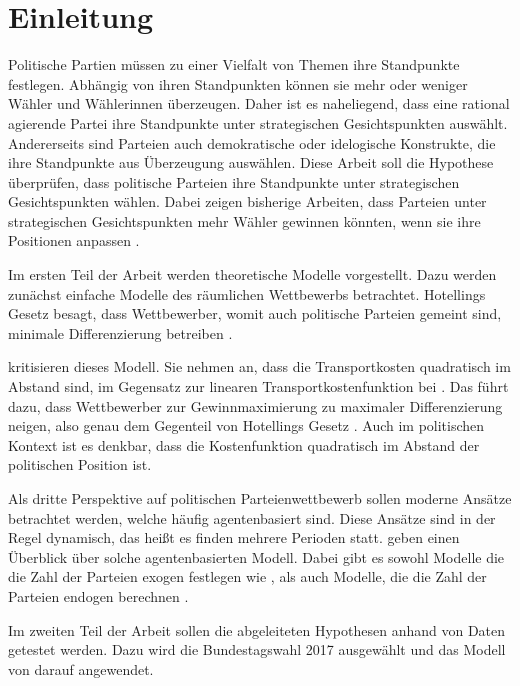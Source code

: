 
\chapter{Einleitung}\label{Kap-Einleitung}
Politische Partien müssen zu einer Vielfalt von Themen ihre Standpunkte festlegen.
Abhängig von ihren Standpunkten können sie mehr oder weniger Wähler und Wählerinnen überzeugen.
Daher ist es naheliegend, dass eine rational agierende Partei ihre Standpunkte unter strategischen Gesichtspunkten auswählt.
Andererseits sind Parteien auch demokratische oder idelogische Konstrukte, die ihre Standpunkte aus Überzeugung auswählen.
Diese Arbeit soll die Hypothese überprüfen, dass politische Parteien ihre Standpunkte unter strategischen Gesichtspunkten wählen.
Dabei zeigen bisherige Arbeiten, dass Parteien unter strategischen Gesichtspunkten mehr Wähler gewinnen könnten, wenn sie ihre Positionen anpassen \citep[S.\,257]{schofield1998germany}.

Im ersten Teil der Arbeit werden theoretische Modelle vorgestellt.
Dazu werden  zunächst einfache Modelle des räumlichen Wettbewerbs betrachtet.
Hotellings Gesetz besagt, dass Wettbewerber, womit auch politische Parteien gemeint sind, minimale Differenzierung betreiben \citep[S.\,54-55]{hotelling1929}.

\citet{aspremont1979} kritisieren dieses Modell.
Sie nehmen an, dass die Transportkosten quadratisch im Abstand sind, im Gegensatz zur linearen Transportkostenfunktion bei \citet{hotelling1929}.
Das führt dazu, dass Wettbewerber zur Gewinnmaximierung zu maximaler Differenzierung neigen, also genau dem Gegenteil von Hotellings Gesetz \citep[S.\,1149]{aspremont1979}.
Auch im politischen Kontext ist es denkbar, dass die Kostenfunktion quadratisch im Abstand der politischen Position ist.

Als dritte Perspektive auf politischen Parteienwettbewerb sollen moderne Ansätze betrachtet werden, welche häufig agentenbasiert sind.
Diese Ansätze sind in der Regel dynamisch, das heißt es finden mehrere Perioden statt.
\citet{marchi2014ABMs} geben einen Überblick über solche agentenbasierten Modell.
Dabei gibt es sowohl Modelle die die Zahl der Parteien exogen festlegen wie \citet{laver2005policy}, als auch Modelle, die die Zahl der Parteien endogen berechnen \citep{laver2007endogenousParties}.

Im zweiten Teil der Arbeit sollen die abgeleiteten Hypothesen anhand von Daten getestet werden.
Dazu wird die Bundestagswahl 2017 ausgewählt und das Modell von \citet{laver2005policy} darauf angewendet.

